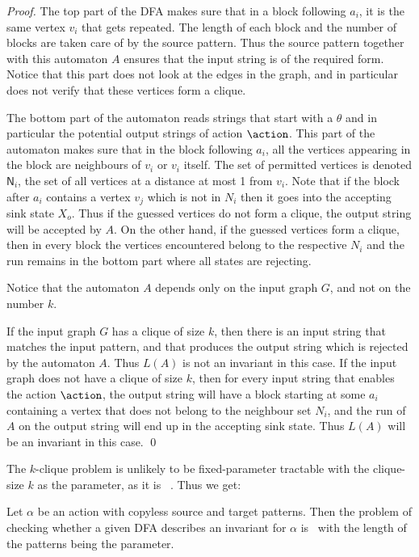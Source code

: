 \begin{proof}
The top part of the DFA makes sure that in a block following $a_i$, it is the same vertex $v_i$ that gets repeated. The length of each block and the number of blocks are taken care of by the source pattern. 
Thus the source pattern together with this automaton $A$ ensures that the input string is of the required form. Notice that this part does not look at the edges in the graph, and in particular does not verify that these vertices form a clique. 

The bottom part of the automaton reads strings that start with a $\theta$ and in particular the potential output strings of action $\action$. This part of the automaton makes sure that in the block following $a_i$, all the vertices appearing in the block are neighbours of $v_i$ or $v_i$ itself. The set of permitted vertices is denoted $\textsf{N}_i$, the set of all vertices at a distance at most 1 from $v_i$. Note that if the block after $a_i$ contains a vertex $v_j$ which is not in $N_i$ then it goes into the accepting sink state $X_o$.  Thus if the guessed vertices do not form a clique, the output string will be accepted by $A$. On the other hand, if the guessed vertices form a clique, then in every block the vertices encountered belong to the respective $N_i$ and the run remains in the bottom part where all states are rejecting. 

Notice that the automaton $A$ depends only on the input graph $G$, and not on the number $k$. 

If the input graph $G$ has a clique of size $k$, then there is an input string that matches the input pattern, and that produces the output string which is rejected by the automaton $A$. Thus $L(A)$ is not an invariant in this case. If the input graph does not have a clique of size $k$, then for every input string that enables the action $\action$, the output string will have a block starting at some $a_i$ containing a vertex that does not belong to the neighbour set $N_i$, and the run of $A$ on the output string will end up in the accepting sink state. Thus $L(A)$ will be an invariant in this case. \qed
\end{proof}

The $k$-clique problem is unlikely to be fixed-parameter tractable with the clique-size $k$ as the parameter, as it is \woneh\ \cite{DF1995}. Thus we get:

\begin{corollary}
Let $\alpha$ be an action with copyless source and target patterns. Then the problem of checking whether a given DFA describes an invariant for $\alpha$ is \woneh\ with the length of the patterns being the parameter.
\end{corollary}
